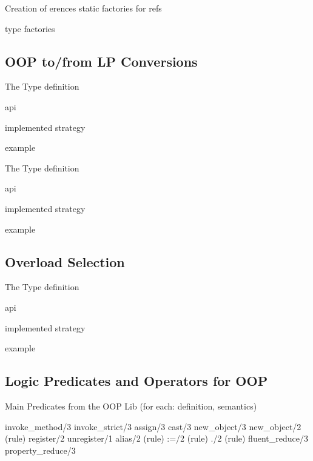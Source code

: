 \documentclass[handout]{beamer}
\begin{document}
\begin{frame}[allowframebreaks]{Creation of erences}
    static factories for refs

    type factories
\end{frame}

\subsection{OOP to/from LP Conversions}

\begin{frame}[allowframebreaks]{The  Type}
    definition

    api

    implemented strategy

    example
\end{frame}

\begin{frame}[allowframebreaks]{The  Type}
    definition

    api

    implemented strategy

    example
\end{frame}

\subsection{Overload Selection}

\begin{frame}[allowframebreaks]{The  Type}
    definition

    api

    implemented strategy

    example
\end{frame}

\subsection{Logic Predicates and Operators for OOP}

\begin{frame}[allowframebreaks]{Main Predicates from the OOP Lib}
    (for each: definition, semantics)

    \ttfamily
    invoke\_method/3
    invoke\_strict/3
    assign/3
    cast/3
    new\_object/3
    new\_object/2 (rule)
    register/2
    unregister/1
    alias/2 (rule)
    :=/2 (rule)
    ./2 (rule)
    fluent\_reduce/3
    property\_reduce/3
\end{frame}
\end{document}
